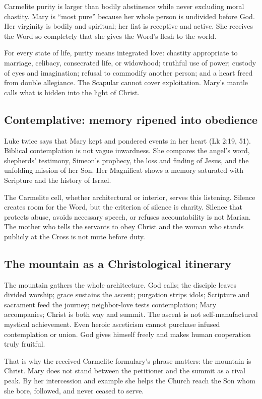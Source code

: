 Carmelite purity is larger than bodily abstinence while never excluding moral chastity. Mary is ``most pure'' because her whole person is undivided before God. Her virginity is bodily and spiritual; her fiat is receptive and active. She receives the Word so completely that she gives the Word's flesh to the world.

For every state of life, purity means integrated love: chastity appropriate to marriage, celibacy, consecrated life, or widowhood; truthful use of power; custody of eyes and imagination; refusal to commodify another person; and a heart freed from double allegiance. The Scapular cannot cover exploitation. Mary's mantle calls what is hidden into the light of Christ.

\subsection{Contemplative: memory ripened into obedience}

Luke twice says that Mary kept and pondered events in her heart (Lk 2:19, 51). Biblical contemplation is not vague inwardness. She compares the angel's word, shepherds' testimony, Simeon's prophecy, the loss and finding of Jesus, and the unfolding mission of her Son. Her Magnificat shows a memory saturated with Scripture and the history of Israel.

The Carmelite cell, whether architectural or interior, serves this listening. Silence creates room for the Word, but the criterion of silence is charity. Silence that protects abuse, avoids necessary speech, or refuses accountability is not Marian. The mother who tells the servants to obey Christ and the woman who stands publicly at the Cross is not mute before duty.

\subsection{The mountain as a Christological itinerary}

The mountain gathers the whole architecture. God calls; the disciple leaves divided worship; grace sustains the ascent; purgation strips idols; Scripture and sacrament feed the journey; neighbor-love tests contemplation; Mary accompanies; Christ is both way and summit. The ascent is not self-manufactured mystical achievement. Even heroic asceticism cannot purchase infused contemplation or union. God gives himself freely and makes human cooperation truly fruitful.

\enlargethispage{\baselineskip}
That is why the received Carmelite formulary's phrase matters: the mountain is Christ. Mary does not stand between the petitioner and the summit as a rival peak. By her intercession and example she helps the Church reach the Son whom she bore, followed, and never ceased to serve.
